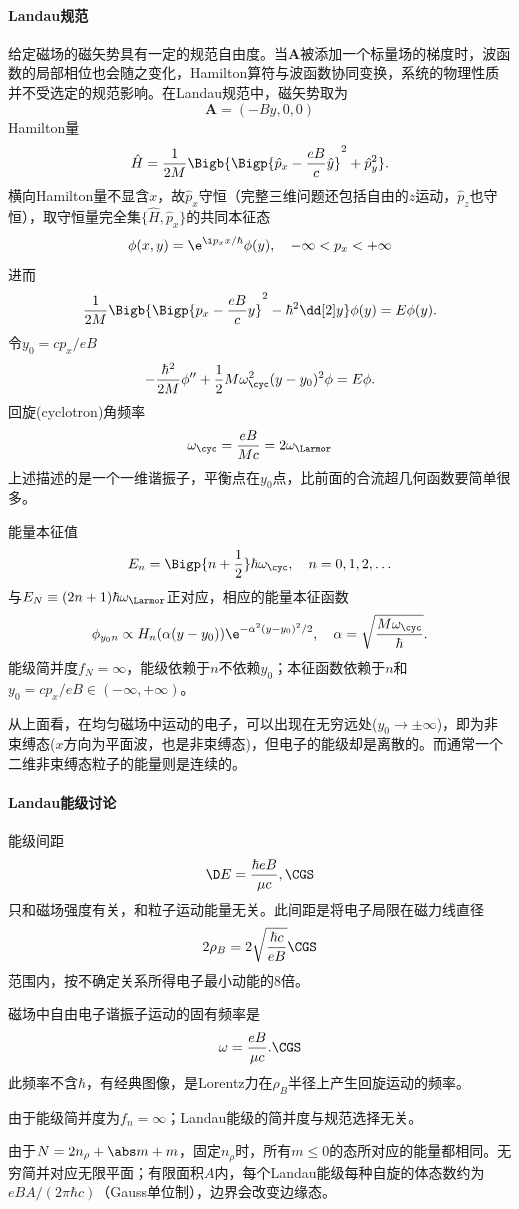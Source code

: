 \paragraph{Landau规范}给定磁场的磁矢势具有一定的规范自由度。当$\bm A$被添加一个标量场的梯度时，波函数的局部相位也会随之变化，Hamilton算符与波函数协同变换，系统的物理性质并不受选定的规范影响。在Landau规范中，磁矢势取为
\[
	\bm A=(-By,0,0)
\]
Hamilton量
\[
	\hat H=\frac1{2M}\Bigb{\Bigp{\hat p_x-\frac{eB}c\hat y}^2+\hat p_y^2}.
\]
横向Hamilton量不显含$x$，故$\hat p_x$守恒（完整三维问题还包括自由的$z$运动，$\hat p_z$也守恒），取守恒量完全集$\{\hat H,\hat p_x\}$的共同本征态
\[
	\phi(x,y)=\e^{\i p_xx/\hbar}\phi(y),\quad-\infty<p_x<+\infty
\]
进而
\[
	\frac1{2M}\Bigb{\Bigp{p_x-\frac{eB}cy}^2-\hbar^2\dd[2]y}\phi(y)=E\phi(y).
\]
令$y_0=cp_x/eB$
\[
	-\frac{\hbar^2}{2M}\phi''+\frac12M\omega_\cyc^2(y-y_0)^2\phi=E\phi.
\]
回旋(cyclotron)角频率
\[
	\omega_\cyc=\frac{eB}{Mc}=2\omega_\Larmor
\]
上述描述的是一个一维谐振子，平衡点在$y_0$点，比前面的合流超几何函数要简单很多。

能量本征值
\[
	E_n=\Bigp{n+\frac12}\hbar\omega_\cyc,\quad n=0,1,2,\ldots
\]
与$E_N\equiv(2n+1)\hbar\omega_\Larmor$正对应，相应的能量本征函数
\[
	\phi_{y_0n}\propto H_n(\alpha(y-y_0))\e^{-\alpha^2(y-y_0)^2/2},\quad\alpha=\sqrt{\frac{M\omega_\cyc}\hbar}.
\]
能级简并度$f_N=\infty$，能级依赖于$n$不依赖$y_0$；本征函数依赖于$n$和$y_0=cp_x/eB\in(-\infty,+\infty)$。

从上面看，在均匀磁场中运动的电子，可以出现在无穷远处($y_0\to\pm\infty$)，即为非束缚态($x$方向为平面波，也是非束缚态)，但电子的能级却是离散的。而通常一个二维非束缚态粒子的能量则是连续的。
\paragraph{Landau能级讨论}
\begin{compactenum}
	\item 能级间距
		\[
			\D E=\frac{\hbar eB}{\mu c},\CGS
		\]
		只和磁场强度有关，和粒子运动能量无关。此间距是将电子局限在磁力线直径
		\[
			2\rho_B=2\sqrt{\frac{\hbar c}{eB}}\CGS
		\]
		范围内，按不确定关系所得电子最小动能的8倍。
	\item 磁场中自由电子谐振子运动的固有频率是
		\[
			\omega=\frac{eB}{\mu c}.\CGS
		\]
		此频率不含$\hbar$，有经典图像，是Lorentz力在$\rho_B$半径上产生回旋运动的频率。
	\item 由于能级简并度为$f_n=\infty$；Landau能级的简并度与规范选择无关。

		由于$N=2n_\rho+\abs m+m$，固定$n_\rho$时，所有$m\leqslant 0$的态所对应的能量都相同。无穷简并对应无限平面；有限面积$A$内，每个Landau能级每种自旋的体态数约为$eBA/(2\pi\hbar c)$（Gauss单位制），边界会改变边缘态。
\end{compactenum}
